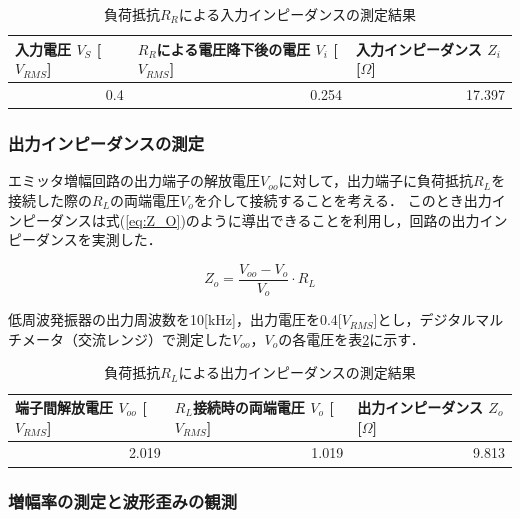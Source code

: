 \documentclass[dvipdfmx,titlepage,a4j]{jsarticle}  %
\numberwithin{equation}{section}
\begin{document}
\begin{table}[H]
  \caption{負荷抵抗$R_R$による入力インピーダンスの測定結果}
  \begin{center}
    \begin{tabular}{l|l|l}
      \hline
      入力電圧 $V_S$ [$V_{RMS}$] & $R_R$による電圧降下後の電圧 $V_i$ [$V_{RMS}$] & 入力インピーダンス $Z_i$ [$\Omega$] \\ \hline\hline
      \multicolumn{1}{r|}{0.4}   & \multicolumn{1}{r|}{0.254}                    & \multicolumn{1}{r}{17.397}          \\ \hline
    \end{tabular}
  \end{center}
  \label{tbl:res;Z_I}
\end{table}


\subsubsection{出力インピーダンスの測定}
エミッタ増幅回路の出力端子の解放電圧$V_{oo}$に対して，出力端子に負荷抵抗$R_L$を接続した際の$R_L$の両端電圧$V_o$を介して接続することを考える．
このとき出力インピーダンスは式(\ref{eq:Z_O})のように導出できることを利用し，回路の出力インピーダンスを実測した．

\begin{equation}
  Z_o = \frac{V_{oo} - V_o}{V_o} \cdot R_L
  \label{eq:Z_O}
\end{equation}

低周波発振器の出力周波数を10[kHz]，出力電圧を0.4[$V_{RMS}$]とし，デジタルマルチメータ（交流レンジ）で測定した$V_{oo}$，$V_o$の各電圧を表\ref{tbl:res;Z_O}に示す．

\begin{table}[H]
  \caption{負荷抵抗$R_L$による出力インピーダンスの測定結果}
  \begin{center}
    \begin{tabular}{l|l|l}
      \hline
      端子間解放電圧 $V_{oo}$ [$V_{RMS}$] & $R_L$接続時の両端電圧 $V_o$ [$V_{RMS}$] & 出力インピーダンス $Z_o$ [$\Omega$] \\ \hline\hline
      \multicolumn{1}{r|}{2.019}          & \multicolumn{1}{r|}{1.019}              & \multicolumn{1}{r}{9.813}           \\ \hline
    \end{tabular}
  \end{center}
  \label{tbl:res;Z_O}
\end{table}

\subsubsection{増幅率の測定と波形歪みの観測}
\end{document}
